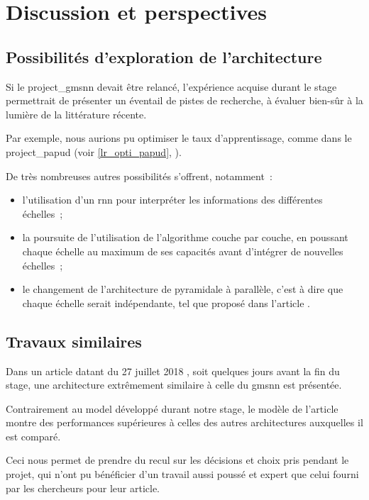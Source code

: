 \section{Discussion et perspectives}
\subsection{Possibilités d'exploration de l'architecture}

Si le \gls{project_gmsnn} devait être relancé, l'expérience acquise durant le stage permettrait de présenter un éventail de pistes de recherche, à évaluer bien-sûr à la lumière de la littérature récente.

Par exemple, nous aurions pu optimiser le taux d'apprentissage, comme dans le \gls{project_papud} (voir \autoref{lr_opti_papud}, ).

De très nombreuses autres possibilités s'offrent, notamment~:
\begin{itemize}
	\item l'utilisation d'un \gls{rnn} pour interpréter les informations des différentes échelles~;
	\item la poursuite de l'utilisation de l'algorithme couche par couche, en poussant chaque échelle au maximum de ses capacités avant d'intégrer de nouvelles échelles~;
	\item le changement de l'architecture de pyramidale à parallèle, c'est à dire que chaque échelle serait indépendante, tel que proposé dans l'article \autocite{Xiao2018Jan}.
\end{itemize}

\subsection{Travaux similaires}
Dans un article datant du 27 juillet 2018 \autocite{hierachical_rnn}, soit quelques jours avant la fin du stage, une architecture extrêmement similaire à celle du \gls{gmsnn} est présentée.

Contrairement au \gls{model} développé durant notre stage, le modèle de l'article montre des performances supérieures à celles des autres architectures auxquelles il est comparé.

Ceci nous permet de prendre du recul sur les décisions et choix pris pendant le projet, qui n'ont pu bénéficier d'un travail aussi poussé et expert que celui fourni par les chercheurs pour leur article.


